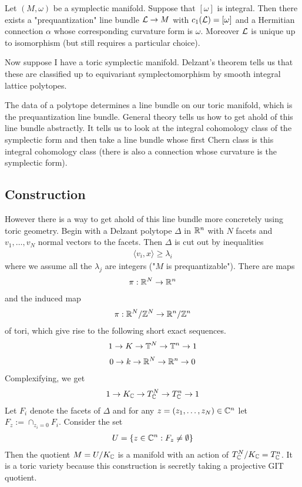 \documentclass[12pt]{article}
\begin{document}
\begin{theorem}
Let $(M,\omega)$ be a symplectic manifold. Suppose that $[\omega]$ is integral. Then 
there exists a "prequantization" line bundle ${\mathcal{L}} \to M$ with $c_1({\mathcal{L}}) = [\omega]$ and a Hermitian connection $\alpha$
whose corresponding curvature form is $\omega$. Moreover ${\mathcal{L}}$ is unique up to isomorphism 
(but still requires a particular choice). 
\end{theorem}

Now suppose I have a toric symplectic manifold. Delzant's theorem tells us that these are classified
up to equivariant symplectomorphism by smooth integral lattice polytopes. 

\hfill

The data of a polytope determines a line bundle on our toric manifold, which is the prequantization line bundle.
General theory tells us how to get ahold of this line bundle abstractly. It tells us to look at the
integral cohomology class of the symplectic form and then take a line bundle whose first Chern class is this
integral cohomology class (there is also a connection whose curvature is the symplectic form).

\subsection{Construction}
However there is a way to get ahold of this line bundle more concretely using toric geometry. Begin with a
Delzant polytope $\Delta$ in $\mathbb{R}^n$ with $N$ facets and $v_1,\dots,v_N$ normal vectors to the facets. Then 
$\Delta$ is cut out by inequalities \begin{align*}
    \langle v_i,x\rangle \geq \lambda_i
\end{align*} where we assume all the $\lambda_j$ are integers ("$M$ is prequantizable"). There are maps \begin{align*}
    \pi:\mathbb{R}^N\to\mathbb{R}^n
\end{align*} and the induced map \begin{align*}
    \pi: \mathbb{R}^N/\mathbb{Z}^N\to\mathbb{R}^n/\mathbb{Z}^n
\end{align*} of tori, which give rise to the following short exact sequences. \begin{align*}
    1\to K \to \mathbb{T}^N \to \mathbb{T}^n \to 1
\end{align*} \begin{align*}
    0\to k \to \mathbb{R}^N\to \mathbb{R}^n\to 0
\end{align*} Complexifying, we get \begin{align*}
    1\to K_{\mathbb{C}} \to T_{\mathbb{C}}^N \to T_{\mathbb{C}}^n \to 1 
\end{align*} Let $F_i$ denote the facets of $\Delta$ and for any $z = (z_1,\dots,z_N)\in\mathbb{C}^n$ let $F_z := \cap_{z_i = 0}F_i$.
Consider the set \begin{align*}
    U = \{z\in\mathbb{C}^n: F_z \neq \emptyset\}
\end{align*} Then the quotient $M = U/K_{\mathbb{C}}$ is a manifold with an action of $T_{\mathbb{C}}^N/K_{\mathbb{C}} = T_{\mathbb{C}}^n$. It 
is a toric variety because this construction is secretly taking a projective GIT quotient.
\end{document}
